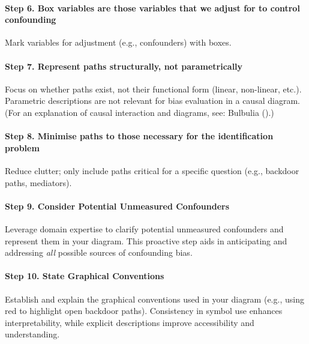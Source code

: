 \documentclass[
  single column]{article}
\let\oldparagraph\paragraph
\renewcommand{\paragraph}[1]{\oldparagraph{#1}\mbox{}}
\begin{document}
\paragraph{Step 6. Box variables are those variables that we adjust for
to control
confounding}\label{step-6.-box-variables-are-those-variables-that-we-adjust-for-to-control-confounding}

Mark variables for adjustment (e.g., confounders) with boxes.

\paragraph{Step 7. Represent paths structurally, not
parametrically}\label{step-7.-represent-paths-structurally-not-parametrically}

Focus on whether paths exist, not their functional form (linear,
non-linear, etc.). Parametric descriptions are not relevant for bias
evaluation in a causal diagram. (For an explanation of causal
interaction and diagrams, see: Bulbulia
().)

\paragraph{Step 8. Minimise paths to those necessary for the
identification
problem}\label{step-8.-minimise-paths-to-those-necessary-for-the-identification-problem}

Reduce clutter; only include paths critical for a specific question
(e.g., backdoor paths, mediators).

\paragraph{Step 9. Consider Potential Unmeasured
Confounders}\label{step-9.-consider-potential-unmeasured-confounders}

Leverage domain expertise to clarify potential unmeasured confounders
and represent them in your diagram. This proactive step aids in
anticipating and addressing \emph{all} possible sources of confounding
bias.

\paragraph{\texorpdfstring{\textbf{Step 10. State Graphical
Conventions}}{Step 10. State Graphical Conventions}}\label{step-10.-state-graphical-conventions}

Establish and explain the graphical conventions used in your diagram
(e.g., using red to highlight open backdoor paths). Consistency in
symbol use enhances interpretability, while explicit descriptions
improve accessibility and understanding.
\end{document}
